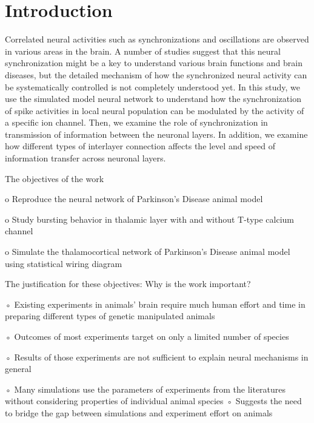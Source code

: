 \chapter{Introduction}


Correlated neural activities such as synchronizations and oscillations are observed in various areas in the brain. A number of studies suggest that this neural synchronization might be a key to understand various brain functions and brain diseases, but the detailed mechanism of how the synchronized neural activity can be systematically controlled is not completely understood yet. 
In this study, we use the simulated model neural network to understand how the synchronization of spike activities in local neural population can be modulated by the activity of a specific ion channel. Then, we examine the role of synchronization in transmission of information between the neuronal layers. In addition, we examine how different types of interlayer connection affects the level and speed of information transfer across neuronal layers. 






The objectives of the work

o Reproduce the neural network of Parkinson’s Disease animal model

o Study bursting behavior in thalamic layer with and without T-type calcium channel

o Simulate the thalamocortical network of Parkinson’s Disease animal model using statistical wiring diagram


The justification for these objectives: Why is the work important?

◦ Existing experiments in animals’ brain require much human effort and time in preparing different types of genetic manipulated animals

◦ Outcomes of most experiments target on only a limited number of species

◦ Results of those experiments are not sufficient to explain neural mechanisms in general

◦ Many simulations use the parameters of experiments from the literatures without considering properties of individual animal species
◦ Suggests the need to bridge the gap between simulations and experiment effort on animals

